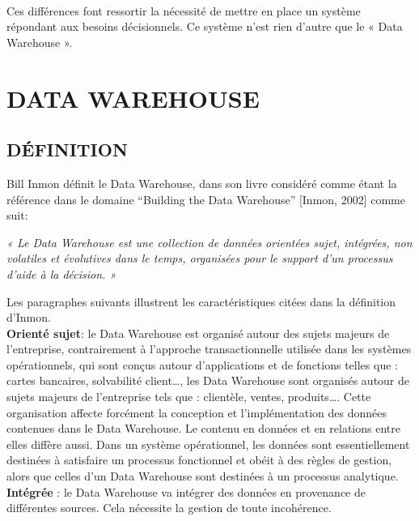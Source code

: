 \paragraph{}
	Ces différences font ressortir la nécessité de mettre en place un système répondant aux besoins décisionnels. Ce système n’est rien d’autre que le « Data Warehouse ».


\section{DATA WAREHOUSE}
 \subsection{ DÉFINITION}
 Bill Inmon définit le Data Warehouse, dans son livre considéré comme étant la référence dans le domaine ``Building the Data Warehouse'' [Inmon, 2002] comme suit:
 
\begin{center}
\textit{« Le Data Warehouse est une collection de données orientées sujet, intégrées, non volatiles et évolutives dans le temps, organisées pour le support d’un processus d’aide à la décision. »}
\end{center}

Les paragraphes suivants illustrent les caractéristiques citées dans la définition d’Inmon.\\

\textbf{Orienté sujet}: le Data Warehouse est organisé autour des sujets majeurs de l’entreprise, contrairement à l’approche transactionnelle utilisée dans les systèmes opérationnels, qui sont conçus autour d’applications et de fonctions telles que : cartes bancaires, solvabilité client…, les Data Warehouse sont organisés autour de sujets majeurs de l’entreprise tels que : clientèle, ventes, produits…. Cette organisation affecte forcément la conception et l’implémentation des données contenues dans le Data Warehouse. Le contenu en données et en relations entre elles diffère aussi. Dans un système opérationnel, les données sont essentiellement destinées à satisfaire un processus fonctionnel et obéit à des règles de gestion, alors que celles d’un Data Warehouse sont destinées à un processus analytique.\\

\textbf{Intégrée }: le Data Warehouse va intégrer des données en provenance de différentes sources. Cela nécessite la gestion de toute incohérence.\\

